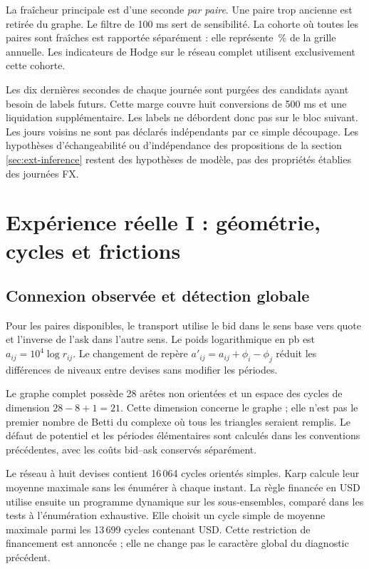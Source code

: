 La fraîcheur principale est d'une seconde \emph{par paire}. Une paire trop ancienne est retirée du graphe. Le filtre de 100 ms sert de sensibilité. La cohorte où toutes les paires sont fraîches est rapportée séparément : elle représente \EmpFreshAllPercent{}\,\% de la grille annuelle. Les indicateurs de Hodge sur le réseau complet utilisent exclusivement cette cohorte.

Les dix dernières secondes de chaque journée sont purgées des candidats ayant besoin de labels futurs. Cette marge couvre huit conversions de 500 ms et une liquidation supplémentaire. Les labels ne débordent donc pas sur le bloc suivant. Les jours voisins ne sont pas déclarés indépendants par ce simple découpage. Les hypothèses d'échangeabilité ou d'indépendance des propositions de la section \ref{sec:ext-inference} restent des hypothèses de modèle, pas des propriétés établies des journées FX.

\clearpage
\section{Expérience réelle I : géométrie, cycles et frictions}
\label{sec:emp-geometry}

\subsection{Connexion observée et détection globale}

Pour les paires disponibles, le transport utilise le bid dans le sens base vers quote et l'inverse de l'ask dans l'autre sens. Le poids logarithmique en pb est \(a_{ij}=10^4\log r_{ij}\). Le changement de repère \(a'_{ij}=a_{ij}+\phi_i-\phi_j\) réduit les différences de niveaux entre devises sans modifier les périodes.

Le graphe complet possède 28 arêtes non orientées et un espace des cycles de dimension \(28-8+1=21\). Cette dimension concerne le graphe ; elle n'est pas le premier nombre de Betti du complexe où tous les triangles seraient remplis. Le défaut de potentiel et les périodes élémentaires sont calculés dans les conventions précédentes, avec les coûts bid--ask conservés séparément.

Le réseau à huit devises contient 16\,064 cycles orientés simples. Karp calcule leur moyenne maximale sans les énumérer à chaque instant. La règle financée en USD utilise ensuite un programme dynamique sur les sous-ensembles, comparé dans les tests à l'énumération exhaustive. Elle choisit un cycle simple de moyenne maximale parmi les 13\,699 cycles contenant USD. Cette restriction de financement est annoncée ; elle ne change pas le caractère global du diagnostic précédent.

